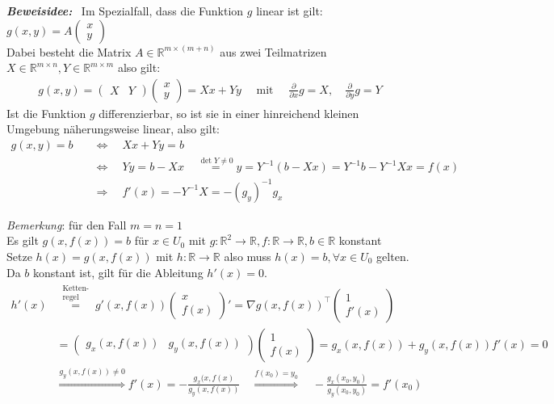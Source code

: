 \documentclass[11pt,a4paper]{book}
\newcommand {\R}	{\mathbb{R}}
\newcommand {\Rzwei}	{\mathbb{R}^2}
\newcommand {\Rmxn}	{\mathbb{R}^{m \times n}}
\newcommand {\Rmxm}	{\mathbb{R}^{m \times m}}
\newcommand{\1}    	{\mathbbm{1}}
\newcommand{\mitt}	{\textrm{ mit }}
\newcommand{\Beweis}[1][Beweis]
{\begin{mdframed}[backgroundcolor=gray!10,linewidth=0pt]\noindent\textit{\textbf{{#1}:}}~}
\newcommand{\QED}	{\end{mdframed}}
\newcommand{\Bemerkung}	{\noindent\textit{Bemerkung}: }
\begin{document}
\Beweis[Beweisidee]
Im Spezialfall, dass die Funktion \(g\) linear ist gilt:
\(
	g(x,y) = A \left( \begin{array}{c}
		x \\ y
	\end{array} \right)
\)\\
Dabei besteht die Matrix \(A \in \R^{m \times (m+n)}\) aus zwei Teilmatrizen \(X \in \Rmxn, Y \in \Rmxm\) also gilt:
\begin{align*}
	g(x,y) = \left( \begin{array}{cc}
		X & Y
	\end{array} \right) \left( \begin{array}{c}
		x \\ y
	\end{array} \right) = Xx + Yy \quad\mitt\quad
	\frac{\partial}{\partial x} g = X, \quad \frac{\partial}{\partial y} g = Y
\end{align*}
Ist die Funktion \(g\) differenzierbar, so ist sie in einer hinreichend kleinen Umgebung näherungsweise linear, also gilt:
\begin{align*}
	g(x,y) = b \quad&\Leftrightarrow\quad Xx + Yy = b \\
	\quad&\Leftrightarrow\quad Yy = b - Xx
	\quad\stackrel{\det Y \neq 0}{=} y = Y^{-1}(b-Xx) = Y^{-1}b - Y^{-1}Xx = f(x) \\
	&\Rightarrow\quad f'(x) = -Y^{-1} X = -(g_y)^{-1} g_x
\end{align*}
\QED
\Bemerkung für den Fall \(m=n=1\) \\
Es gilt \(g(x,f(x)) = b\) für \(x \in U_0\) mit \(g:\Rzwei \rightarrow \R, f:\R \rightarrow \R, b \in \R\) konstant \\
Setze \(h(x) = g(x,f(x))\) mit \(h: \R \rightarrow \R\) also muss \(h(x) = b, \forall x \in U_0\) gelten. Da \(b\) konstant ist, gilt für die Ableitung \(h'(x) = 0\).
\begin{align*}
	h'(x) &\stackrel{\substack{\textrm{Ketten-}\\\textrm{regel}}}{=}
	g'(x,f(x)) \left( \begin{array}{c}
		x \\ f(x)
	\end{array} \right)' = 
	\nabla g (x,f(x))^\top \left( \begin{array}{c}
		1 \\ f'(x)	
	\end{array} \right) \\
	&= \left( \begin{array}{cc}
		g_x(x,f(x)) & g_y(x,f(x))
	\end{array} \right) \left( \begin{array}{c}
		1 \\ f(x)
	\end{array} \right) =
	g_x(x,f(x)) + g_y(x,f(x)) f'(x) = 0 \\
	&\stackrel{g_y(x,f(x))\neq 0}{\Rightarrow} f'(x) = - \frac{g_x(x,f(x)}{g_y(x,f(x))}
	\quad\stackrel{f(x_0)=y_0}{\Rightarrow}\quad - \frac{g_x(x_0,y_0)}{g_y(x_0,y_0)} = f'(x_0)
\end{align*}
\end{document}
